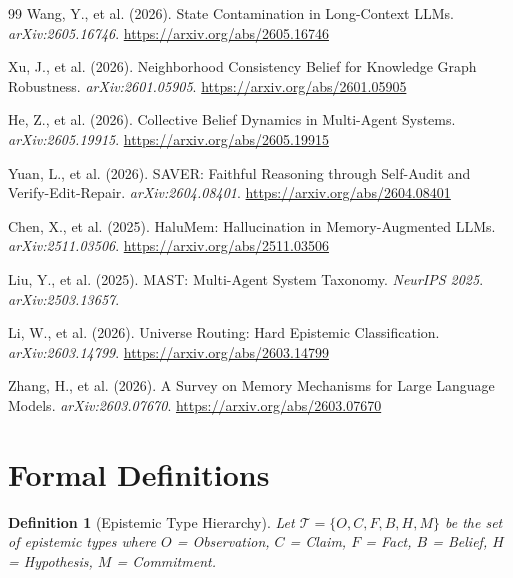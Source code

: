 \documentclass[11pt,letterpaper]{article}
\newtheorem{definition}{Definition}[section]
\begin{document}
\begin{thebibliography}{99}
Wang, Y., et al. (2026).
\newblock State Contamination in Long-Context LLMs.
\newblock \textit{arXiv:2605.16746}. \url{https://arxiv.org/abs/2605.16746}

Xu, J., et al. (2026).
\newblock Neighborhood Consistency Belief for Knowledge Graph Robustness.
\newblock \textit{arXiv:2601.05905}. \url{https://arxiv.org/abs/2601.05905}

He, Z., et al. (2026).
\newblock Collective Belief Dynamics in Multi-Agent Systems.
\newblock \textit{arXiv:2605.19915}. \url{https://arxiv.org/abs/2605.19915}

Yuan, L., et al. (2026).
\newblock SAVER: Faithful Reasoning through Self-Audit and Verify-Edit-Repair.
\newblock \textit{arXiv:2604.08401}. \url{https://arxiv.org/abs/2604.08401}

Chen, X., et al. (2025).
\newblock HaluMem: Hallucination in Memory-Augmented LLMs.
\newblock \textit{arXiv:2511.03506}. \url{https://arxiv.org/abs/2511.03506}

Liu, Y., et al. (2025).
\newblock MAST: Multi-Agent System Taxonomy.
\newblock \textit{NeurIPS 2025}. \textit{arXiv:2503.13657}.

Li, W., et al. (2026).
\newblock Universe Routing: Hard Epistemic Classification.
\newblock \textit{arXiv:2603.14799}. \url{https://arxiv.org/abs/2603.14799}

Zhang, H., et al. (2026).
\newblock A Survey on Memory Mechanisms for Large Language Models.
\newblock \textit{arXiv:2603.07670}. \url{https://arxiv.org/abs/2603.07670}

\end{thebibliography}

\appendix
\section{Formal Definitions}
\label{app:formal}

\begin{definition}[Epistemic Type Hierarchy]
\label{def:types}
Let $\mathcal{T} = \{O, C, F, B, H, M\}$ be the set of epistemic types where $O$ = Observation, $C$ = Claim, $F$ = Fact, $B$ = Belief, $H$ = Hypothesis, $M$ = Commitment.
\end{definition}
\end{document}

